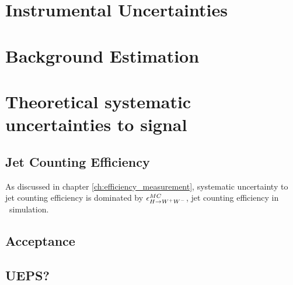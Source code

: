 \section{Instrumental Uncertainties} 

\section{Background Estimation} 

\section{Theoretical systematic uncertainties to signal}

\subsection{Jet Counting Efficiency} 

As discussed in chapter \ref{ch:efficiency_measurement}, systematic uncertainty to 
jet counting efficiency is dominated by $\epsilon_{H\to W^+W^-}^{MC}$, jet counting efficiency 
in \hww~simulation.  


\subsection{Acceptance}

\subsection{UEPS?}
